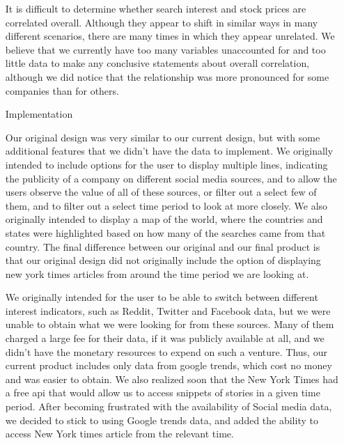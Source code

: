 \documentclass[12pt]{article}
\begin{document}
\begin{enumerate}
It is difficult to determine whether search interest and stock prices
are correlated overall. Although they appear to shift in similar ways
in many different scenarios, there are many times in which they appear
unrelated. We believe that we currently have too many variables
unaccounted for and too little data to make any conclusive statements
about overall correlation, although we did notice that the
relationship was more pronounced for some companies than for others. 

\item[Implementation] 

Our original design was very similar to our current design, but with
some additional features that we didn’t have the data to implement. We
originally intended to include options for the user to display
multiple lines, indicating the publicity of a company on different
social media sources, and to allow the users observe the value of all
of these sources, or filter out a select few of them, and to filter
out a select time period to look at more closely. We also originally
intended to display a map of the world, where the countries and states
were highlighted based on how many of the searches came from that
country. The final difference between our original and our final
product is that our original design did not originally include the
option of displaying new york times articles from around the time
period we are looking at. 

We originally intended for the user to be able to switch between
different interest indicators, such as Reddit, Twitter and Facebook
data, but we were unable to obtain what we were looking for from these
sources. Many of them charged a large fee for their data, if it was
publicly available at all, and we didn’t have the monetary resources
to expend on such a venture. Thus, our current product includes only
data from google trends, which cost no money and was easier to
obtain. We also realized soon that the New York Times had a free api
that would allow us to access snippets of stories in a given time
period. After becoming frustrated with the availability of Social
media data, we decided to stick to using Google trends data, and added
the ability to access New York times article from the relevant time. 


\end{enumerate}
\end{document}
